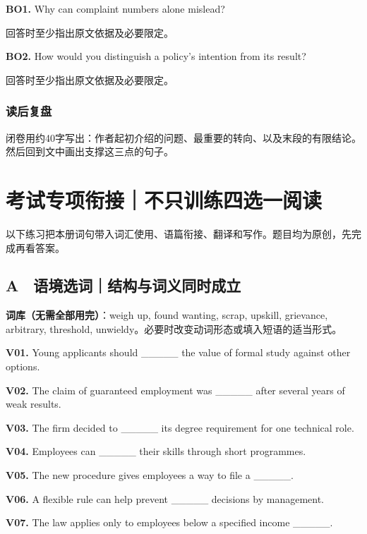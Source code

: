\documentclass[
  11pt,
]{ctexart}
\begin{document}
\textbf{BO1.} Why can complaint numbers alone mislead?

回答时至少指出原文依据及必要限定。

\textbf{BO2.} How would you distinguish a policy's intention from its
result?

回答时至少指出原文依据及必要限定。

\subsubsection{读后复盘}\label{ux8bfbux540eux590dux76d8-1}

闭卷用约40字写出：作者起初介绍的问题、最重要的转向、以及末段的有限结论。然后回到文中画出支撑这三点的句子。

\section{考试专项衔接｜不只训练四选一阅读}\label{ux8003ux8bd5ux4e13ux9879ux8854ux63a5ux4e0dux53eaux8badux7ec3ux56dbux9009ux4e00ux9605ux8bfb}

以下练习把本册词句带入词汇使用、语篇衔接、翻译和写作。题目均为原创，先完成再看答案。

\subsection{A　语境选词｜结构与词义同时成立}\label{a-ux8bedux5883ux9009ux8bcdux7ed3ux6784ux4e0eux8bcdux4e49ux540cux65f6ux6210ux7acb}

\textbf{词库（无需全部用完）}：weigh up, found wanting, scrap, upskill,
grievance, arbitrary, threshold,
unwieldy。必要时改变动词形态或填入短语的适当形式。

\textbf{V01.} Young applicants should \_\_\_\_\_ the value of formal
study against other options.

\textbf{V02.} The claim of guaranteed employment was \_\_\_\_\_ after
several years of weak results.

\textbf{V03.} The firm decided to \_\_\_\_\_ its degree requirement for
one technical role.

\textbf{V04.} Employees can \_\_\_\_\_ their skills through short
programmes.

\textbf{V05.} The new procedure gives employees a way to file a
\_\_\_\_\_.

\textbf{V06.} A flexible rule can help prevent \_\_\_\_\_ decisions by
management.

\textbf{V07.} The law applies only to employees below a specified income
\_\_\_\_\_.
\end{document}
